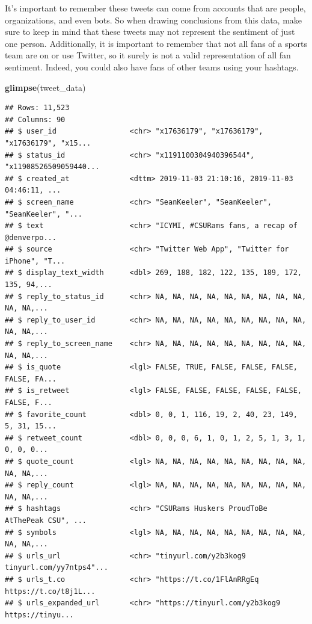 \documentclass[]{book}
\newenvironment{Shaded}{\begin{snugshade}}{\end{snugshade}}
\newcommand{\KeywordTok}[1]{\textcolor[rgb]{0.13,0.29,0.53}{\textbf{#1}}}
\newcommand{\NormalTok}[1]{#1}
\begin{document}
It's important to remember these tweets can come from accounts that are people, organizations, and even bots. So when drawing conclusions from this data, make sure to keep in mind that these tweets may not represent the sentiment of just one person. Additionally, it is important to remember that not all fans of a sports team are on or use Twitter, so it surely is not a valid representation of all fan sentiment. Indeed, you could also have fans of other teams using your hashtags.

\begin{Shaded}
\begin{Highlighting}[]
\KeywordTok{glimpse}\NormalTok{(tweet_data)}
\end{Highlighting}
\end{Shaded}

\begin{verbatim}
## Rows: 11,523
## Columns: 90
## $ user_id                 <chr> "x17636179", "x17636179", "x17636179", "x15...
## $ status_id               <chr> "x1191100304940396544", "x11908526509059440...
## $ created_at              <dttm> 2019-11-03 21:10:16, 2019-11-03 04:46:11, ...
## $ screen_name             <chr> "SeanKeeler", "SeanKeeler", "SeanKeeler", "...
## $ text                    <chr> "ICYMI, #CSURams fans, a recap of @denverpo...
## $ source                  <chr> "Twitter Web App", "Twitter for iPhone", "T...
## $ display_text_width      <dbl> 269, 188, 182, 122, 135, 189, 172, 135, 94,...
## $ reply_to_status_id      <chr> NA, NA, NA, NA, NA, NA, NA, NA, NA, NA, NA,...
## $ reply_to_user_id        <chr> NA, NA, NA, NA, NA, NA, NA, NA, NA, NA, NA,...
## $ reply_to_screen_name    <chr> NA, NA, NA, NA, NA, NA, NA, NA, NA, NA, NA,...
## $ is_quote                <lgl> FALSE, TRUE, FALSE, FALSE, FALSE, FALSE, FA...
## $ is_retweet              <lgl> FALSE, FALSE, FALSE, FALSE, FALSE, FALSE, F...
## $ favorite_count          <dbl> 0, 0, 1, 116, 19, 2, 40, 23, 149, 5, 31, 15...
## $ retweet_count           <dbl> 0, 0, 0, 6, 1, 0, 1, 2, 5, 1, 3, 1, 0, 0, 0...
## $ quote_count             <lgl> NA, NA, NA, NA, NA, NA, NA, NA, NA, NA, NA,...
## $ reply_count             <lgl> NA, NA, NA, NA, NA, NA, NA, NA, NA, NA, NA,...
## $ hashtags                <chr> "CSURams Huskers ProudToBe AtThePeak CSU", ...
## $ symbols                 <lgl> NA, NA, NA, NA, NA, NA, NA, NA, NA, NA, NA,...
## $ urls_url                <chr> "tinyurl.com/y2b3kog9 tinyurl.com/yy7ntps4"...
## $ urls_t.co               <chr> "https://t.co/1FlAnRRgEq https://t.co/t8j1L...
## $ urls_expanded_url       <chr> "https://tinyurl.com/y2b3kog9 https://tinyu...

\end{verbatim}
\end{document}

